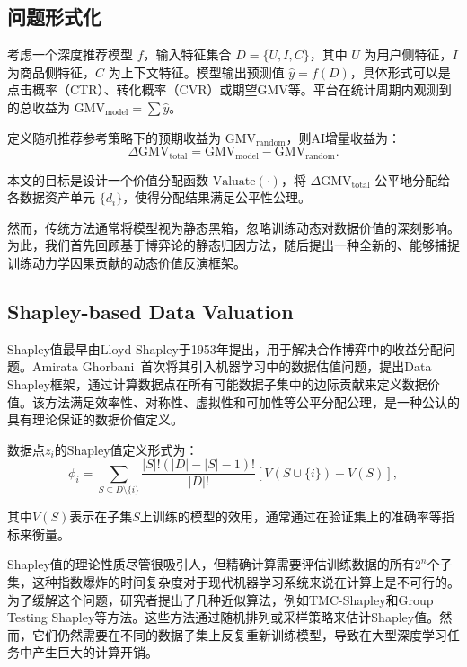 \documentclass[12pt,a4paper]{ctexart}
\theoremstyle{definition}
\theoremstyle{plain}
\begin{document}
\subsection{问题形式化}
\label{sec:problem_formalization}
考虑一个深度推荐模型 $f$，输入特征集合 $D = \{U, I, C\}$，其中 $U$ 为用户侧特征，$I$ 为商品侧特征，$C$ 为上下文特征。模型输出预测值 $\hat{y} = f(D)$，具体形式可以是点击概率（CTR）、转化概率（CVR）或期望GMV等。平台在统计周期内观测到的总收益为 $\text{GMV}_{\text{model}} = \sum \hat{y}$。

定义随机推荐参考策略下的预期收益为 $\text{GMV}_{\text{random}}$，则AI增量收益为：
\[
\Delta\text{GMV}_{\text{total}} = \text{GMV}_{\text{model}} - \text{GMV}_{\text{random}}.
\]

本文的目标是设计一个价值分配函数 $\text{Valuate}(\cdot)$，将 $\Delta\text{GMV}_{\text{total}}$ 公平地分配给各数据资产单元 $\{d_i\}$，使得分配结果满足公平性公理。

然而，传统方法通常将模型视为静态黑箱，忽略训练动态对数据价值的深刻影响。为此，我们首先回顾基于博弈论的静态归因方法，随后提出一种全新的、能够捕捉训练动力学因果贡献的动态价值反演框架。

\subsection{Shapley-based Data Valuation}
Shapley值最早由Lloyd Shapley于1953年提出\cite{shapley1953value}，用于解决合作博弈中的收益分配问题。Amirata Ghorbani~\cite{ghorbani2019data}首次将其引入机器学习中的数据估值问题，提出Data Shapley框架，通过计算数据点在所有可能数据子集中的边际贡献来定义数据价值。该方法满足效率性、对称性、虚拟性和可加性等公平分配公理，是一种公认的具有理论保证的数据价值定义。

数据点$z_i$的Shapley值定义形式为：
\begin{equation}
\phi_i =\sum_{S \subseteq D\setminus\{i\}}\frac{|S|!(|D|-|S|-1)!}{|D|!}\left[V(S\cup\{i\})-V(S)\right],
\end{equation}

其中$V(S)$表示在子集$S$上训练的模型的效用，通常通过在验证集上的准确率等指标来衡量。

Shapley值的理论性质尽管很吸引人，但精确计算需要评估训练数据的所有$2^n$个子集，这种指数爆炸的时间复杂度对于现代机器学习系统来说在计算上是不可行的。为了缓解这个问题，研究者提出了几种近似算法，例如TMC-Shapley和Group Testing Shapley等方法\cite{jia2019towards}。这些方法通过随机排列或采样策略来估计Shapley值。然而，它们仍然需要在不同的数据子集上反复重新训练模型，导致在大型深度学习任务中产生巨大的计算开销。
\end{document}
